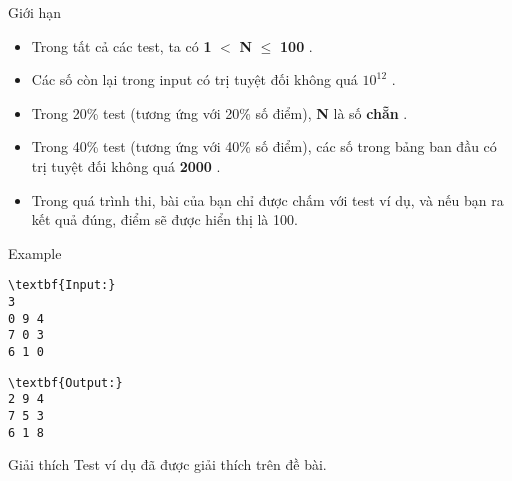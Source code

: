 Giới hạn
\begin{itemize}
	\item     Trong tất cả các test, ta có    \textbf{     1    }    $<$    \textbf{     N    }     $\le$     \textbf{     100    }    .   
	\item     Các số còn lại trong input có trị tuyệt đối không quá    \textbf{     $10^{12}$}    .   
	\item     Trong 20\% test (tương ứng với 20\% số điểm),    \textbf{     N    }    là số    \textbf{     chẵn    }    .   
	\item     Trong 40\% test (tương ứng với 40\% số điểm), các số trong bảng ban đầu có trị tuyệt đối không quá    \textbf{     2000    }    .   
	\item     Trong quá trình thi, bài của bạn chỉ được chấm với test ví dụ, và nếu bạn ra kết quả đúng, điểm sẽ được hiển thị là 100.   
\end{itemize}
Example
\begin{verbatim}
\textbf{Input:}
3
0 9 4
7 0 3
6 1 0
\end{verbatim}
\begin{verbatim}
\textbf{Output:}
2 9 4
7 5 3
6 1 8
\end{verbatim}
Giải thích
Test ví dụ đã được giải thích trên đề bài.